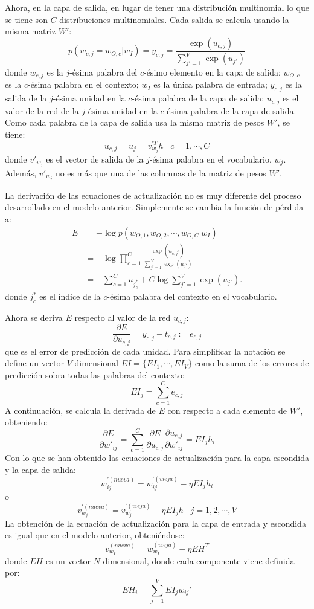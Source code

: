 Ahora, en la capa de salida, en lugar de tener una distribución multinomial lo que se tiene son $C$ distribuciones
multinomiales. Cada salida se calcula usando la misma matriz $W'$:
\[
  p\left( w_{c,j} = w_{O,c} | w_I \right) = y_{c,j} = \frac{\exp(u_{c,j})}{\sum_{j'=1}^V\exp(u_{j'})}
\]
donde $w_{c,j}$ es la $j$-ésima palabra del $c$-ésimo elemento en la capa de salida; $w_{O,c}$ es la $c$-ésima
palabra en el contexto; $w_I$ es la única palabra de entrada; $y_{c,j}$ es la salida de la $j$-ésima unidad en la $c$-ésima
palabra de la capa de salida; $u_{c,j}$ es el valor de la red de la $j$-ésima unidad en la $c$-ésima palabra de la capa de salida.
Como cada palabra de la capa de salida usa la misma matriz de pesos $W'$, se tiene:
\[
  u_{c,j} = u_j = v^{'T}_{w_j}h \;\;\; c=1,\cdots, C
\]
donde $v'_{w_j}$ es el vector de salida de la $j$-ésima palabra en el vocabulario, $w_j$. Además, $v'_{w_j}$ no es más que una de las
columnas de la matriz de pesos $W'$.

La derivación de las ecuaciones de actualización no es muy diferente del proceso desarrollado en el modelo anterior. Simplemente se cambia la función de pérdida a:
\begin{align}
  E & = - \log p\left( w_{O,1}, w_{O,2}, \cdots, w_{O,C} | w_I \right) \\
    & = - \log \prod_{c=1}^C \frac{\exp(u_{c,j_c^*})}{\sum_{j'=1}^V\exp(u_{j'})} \\
    & = - \sum_{c=1}^C u_{j^*_c} + C\log \sum_{j'=1}^V\exp(u_{j'}).
\end{align}
donde $j_c^*$ es el índice de la $c$-ésima palabra del contexto en el vocabulario.

Ahora se deriva $E$ respecto al valor de la red $u_{c,j}$:
\[
  \frac{\partial E}{\partial u_{c,j}} = y_{c,j} - t_{c,j} := e_{c,j}
\]
que es el error de predicción de cada unidad. Para simplificar la notación se define un vector $V$-dimensional $EI=\{EI_1, \cdots, EI_V\}$ como la suma de los errores de
predicción sobra todas las palabras del contexto:
\[
  EI_j = \sum_{c=1}^C e_{c,j}
\]
A continuación, se calcula la derivada de $E$ con respecto a cada elemento de $W'$, obteniendo:
\[
  \frac{\partial E}{\partial w'_{ij}} = \sum_{c=1}^C \frac{\partial E}{\partial u_{c,j}} \frac{\partial u_{c,j}}{\partial w'_{ij}} = EI_j h_i
\]
Con lo que se han obtenido las ecuaciones de actualización para la capa escondida y la capa de salida:
\[
w_{ij}^{'(nueva)} = w_{ij}^{'(vieja)} - \eta EI_j h_i
\]
o
\[
  v_{w_{j}}^{'(nueva)}= v_{w_j}^{'(vieja)} - \eta EI_j h \;\;\; j = 1,2, \cdots, V
\]
La obtención de la ecuación de actualización para la capa de entrada y escondida es igual que en el modelo anterior, obteniéndose:
\[
  v_{w_I}^{(nueva)} = w_{w_I}^{(vieja)} - \eta EH^T
\]
donde $EH$ es un vector $N$-dimensional, donde cada componente viene definida por:
\[
  EH_i = \sum_{j=1}^V EI_j w_{ij}'
\]

